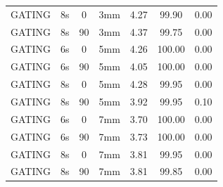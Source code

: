 \documentclass[type=dr, dr=rernat, accentcolor=tud7b,colorbacktitle, bigchapter, openright, twoside, 12pt ]{tudthesis}
\begin{document}
\begin{table}[H]
\begin{tabular}{|c||c|c|c||c|c|c|}
GATING & 8s & 0 & 3mm & 4.27 & 99.90 & 0.00 \\
GATING & 8s & 90 & 3mm & 4.37 & 99.75 & 0.00 \\
GATING & 6s & 0 & 5mm & 4.26 & 100.00 & 0.00 \\
GATING & 6s & 90 & 5mm & 4.05 & 100.00 & 0.00 \\
GATING & 8s & 0 & 5mm & 4.28 & 99.95 & 0.00 \\
GATING & 8s & 90 & 5mm & 3.92 & 99.95 & 0.10 \\
GATING & 6s & 0 & 7mm & 3.70 & 100.00 & 0.00 \\
GATING & 6s & 90 & 7mm & 3.73 & 100.00 & 0.00 \\
GATING & 8s & 0 & 7mm & 3.81 & 99.95 & 0.00 \\
GATING & 8s & 90 & 7mm & 3.81 & 99.85 & 0.00 \\
    \hline\hline 
  \end{tabular}
\end{table}

\newpage
\end{document}

